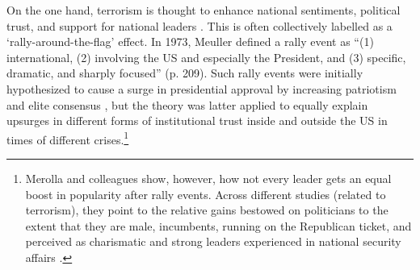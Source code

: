 On the one hand, terrorism is thought to enhance national sentiments, political trust, and support for national leaders \citep[e.g.,][]{Moskalenko2006, Dinesen2013a, Feinstein2018, Landau2004, Ladd2007, Lambert2010}. This is often collectively labelled as a `rally-around-the-flag' effect. In 1973, Meuller defined a rally event as ``(1) international, (2) involving the US and especially the President, and (3) specific, dramatic, and sharply focused'' (p. 209). Such rally events were initially hypothesized to cause a surge in presidential approval by increasing patriotism and elite consensus \citep{Brody1989, Baker2001, Berinsky2009, Mueller1970, Mueller1973}, but the theory was latter applied to equally explain upsurges in different forms of institutional trust inside and outside the US in times of different crises.\footnote{Merolla and colleagues show, however, how not every leader gets an equal boost in popularity after rally events. Across different studies (related to terrorism), they point to the relative gains bestowed on politicians to the extent that they are male, incumbents, running on the Republican ticket, and perceived as charismatic and strong leaders experienced in national security affairs \citep{Holman2019a, Holman2011, Holman2016a, Merolla2007, Merolla2009a, Merolla2009b, Merolla2013}.} 


